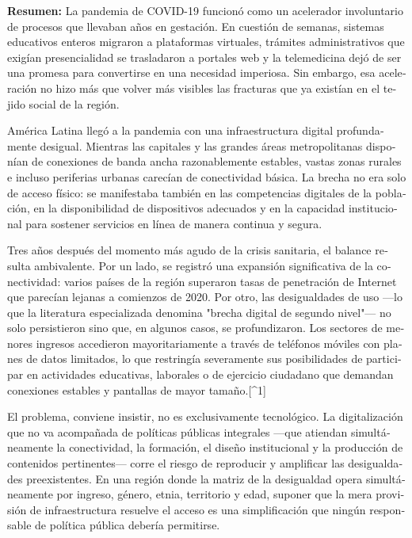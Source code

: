 \begin{tcolorbox}[colback=brown!8!white,colframe=brown!8!white,boxrule=0pt,arc=2pt,left=4pt,right=4pt,top=3pt,bottom=3pt,before skip=4pt,after skip=4pt]
\begin{otherlanguage}{spanish}
\sffamily\small \textbf{Resumen:} La pandemia de COVID-19 funcionó como un acelerador involuntario de procesos que llevaban años en gestación. En cuestión de semanas, sistemas educativos enteros migraron a plataformas virtuales, trámites administrativos que exigían presencialidad se trasladaron a portales web y la telemedicina dejó de ser una promesa para convertirse en una necesidad imperiosa. Sin embargo, esa aceleración no hizo más que volver más visibles las fracturas que ya existían en el tejido social de la región.

América Latina llegó a la pandemia con una infraestructura digital profundamente desigual. Mientras las capitales y las grandes áreas metropolitanas disponían de conexiones de banda ancha razonablemente estables, vastas zonas rurales e incluso periferias urbanas carecían de conectividad básica. La brecha no era solo de acceso físico: se manifestaba también en las competencias digitales de la población, en la disponibilidad de dispositivos adecuados y en la capacidad institucional para sostener servicios en línea de manera continua y segura.

Tres años después del momento más agudo de la crisis sanitaria, el balance resulta ambivalente. Por un lado, se registró una expansión significativa de la conectividad: varios países de la región superaron tasas de penetración de Internet que parecían lejanas a comienzos de 2020. Por otro, las desigualdades de uso ---lo que la literatura especializada denomina "brecha digital de segundo nivel"--- no solo persistieron sino que, en algunos casos, se profundizaron. Los sectores de menores ingresos accedieron mayoritariamente a través de teléfonos móviles con planes de datos limitados, lo que restringía severamente sus posibilidades de participar en actividades educativas, laborales o de ejercicio ciudadano que demandan conexiones estables y pantallas de mayor tamaño.[\textasciicircum{}1]

El problema, conviene insistir, no es exclusivamente tecnológico. La digitalización que no va acompañada de políticas públicas integrales ---que atiendan simultáneamente la conectividad, la formación, el diseño institucional y la producción de contenidos pertinentes--- corre el riesgo de reproducir y amplificar las desigualdades preexistentes. En una región donde la matriz de la desigualdad opera simultáneamente por ingreso, género, etnia, territorio y edad, suponer que la mera provisión de infraestructura resuelve el acceso es una simplificación que ningún responsable de política pública debería permitirse.


\end{otherlanguage}
\end{tcolorbox}
